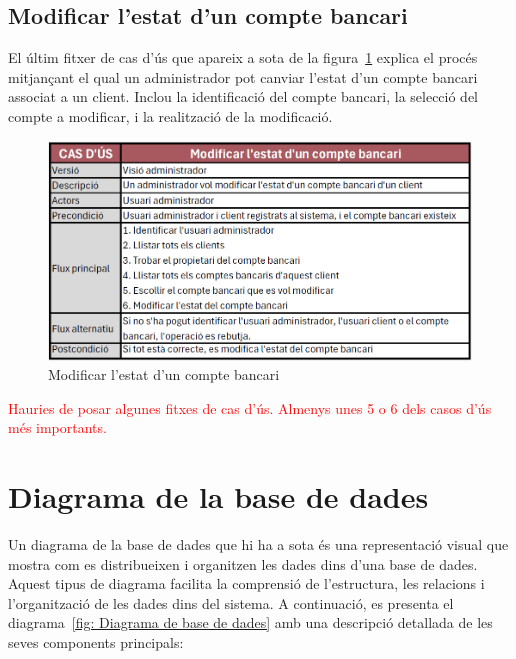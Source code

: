\documentclass[a4paper,12pt,twoside]{ThesisStyle}
\newcommand{\pau}[1]{\textcolor{red}{#1}}
\begin{document}
\clearpage
\subsection{Modificar l'estat d'un compte bancari}
\label{subsec:Modificar l'estat d'un compte bancari}

El últim fitxer de cas d'ús que apareix a sota de la figura~\ref{fig:Modificar l'estat d'un compte bancari} explica el procés mitjançant el qual un administrador pot canviar l'estat d'un compte bancari associat a un client. Inclou la identificació del compte bancari, la selecció del compte a modificar, i la realització de la modificació.

\begin{figure}[h]
    \centering
    \includegraphics[width=1\textwidth]{imatges/f5.png}
    \caption{Modificar l'estat d'un compte bancari}
    \label{fig:Modificar l'estat d'un compte bancari}
\end{figure}


\pau{Hauries de posar algunes fitxes de cas d'ús. Almenys unes 5 o 6 dels casos d'ús més importants.}

\clearpage
\section{Diagrama de la base de dades}
\label{sec: diagrama de base de dades}

Un diagrama de la base de dades que hi ha a sota és una representació visual que mostra com es distribueixen i organitzen les dades dins d'una base de dades. Aquest tipus de diagrama facilita la comprensió de l'estructura, les relacions i l'organització de les dades dins del sistema. A continuació, es presenta el diagrama~\ref{fig: Diagrama de base de dades} amb una descripció detallada de les seves components principals:
\end{document}
